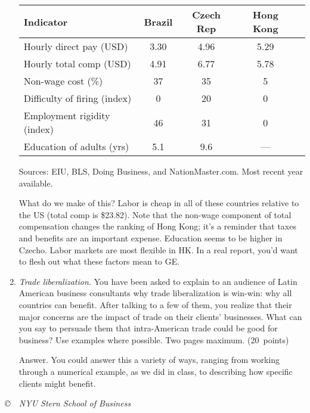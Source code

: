 \documentclass[letterpaper,12pt]{article}
\begin{document}
\begin{enumerate}
\begin{center}
\begin{tabular}{lcccc}
\hline\hline
Indicator   & Brazil & Czech Rep & Hong Kong  \\
\hline\hline 
Hourly direct pay (USD) & 3.30 & 4.96   & 5.29  \\
Hourly total comp (USD) & 4.91 & 6.77   & 5.78  \\
Non-wage cost (\%)       &  37  &   35   &  5    \\
Difficulty of firing (index)   &  0   & 20     &  0  \\
Employment rigidity (index)    & 46   & 31     &  0  \\
Education of adults (yrs) &  5.1  &  9.6  & --- \\
\hline\hline 
\end{tabular}
\end{center}
Sources:  EIU, BLS, Doing Business, and NationMaster.com.  
Most recent year available.   

What do we make of this?  
Labor is cheap in all of these countries relative 
to the US (total comp is \$23.82).  
Note that the non-wage component of total compensation 
changes the ranking of Hong Kong; 
it's a reminder that taxes and benefits are an important expense.  
Education seems to be higher in Czecho.  
Labor markets are most flexible in HK.
In a real report, you'd want to flesh out what these factors mean
to GE.  


\item {\it Trade liberalization.} You have been asked to explain
to an audience of Latin American business 
consultants why trade liberalization is win-win:  
why all countries can benefit.  
After talking to a few of them, you realize that their major concerns 
are the impact of trade on  their clients' businesses.
What can you say to persuade them that intra-American
trade could be good for business?  
Use examples where possible.  
Two pages maximum.     
(20~points) 

Answer.  
You could answer this a variety of ways, ranging from working 
through a numerical example, as we did in class, 
to describing how specific clients might benefit. 

\end{enumerate}


\vfill \centerline{\it \copyright \ \number\year \ NYU Stern
School of Business}
\end{document}
